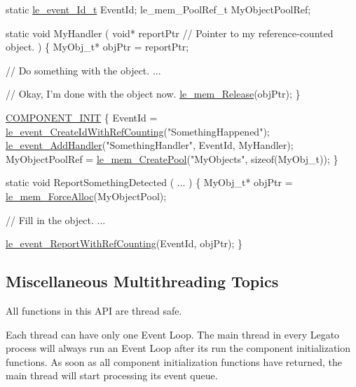 \begin{DoxyCode}
\textcolor{keyword}{static} \hyperlink{le__event_loop_8h_ae6e351b38bc95954f159d16d19d2d55c}{le\_event\_Id\_t} EventId;
le\_mem\_PoolRef\_t MyObjectPoolRef;

\textcolor{keyword}{static} \textcolor{keywordtype}{void} MyHandler
(
    \textcolor{keywordtype}{void}* reportPtr  \textcolor{comment}{// Pointer to my reference-counted object.}
)
\{
    MyObj\_t* objPtr = reportPtr;

    \textcolor{comment}{// Do something with the object.}
    ...

    \textcolor{comment}{// Okay, I'm done with the object now.}
    \hyperlink{le__mem_8h_a6d8e3fe430bcb81efe97b57ce30ef2de}{le\_mem\_Release}(objPtr);
\}

\hyperlink{le__event_loop_8h_abdb9187a56836a93d19cc793cbd4b7ec}{COMPONENT\_INIT}
\{
    EventId = \hyperlink{le__event_loop_8h_a31bef8276ad0e911fd84fb710d58ca2b}{le\_event\_CreateIdWithRefCounting}(\textcolor{stringliteral}{"SomethingHappened"});
    \hyperlink{le__event_loop_8h_ae65a65b4111618f47d7e6d57a48289e5}{le\_event\_AddHandler}(\textcolor{stringliteral}{"SomethingHandler"}, EventId, MyHandler);
    MyObjectPoolRef = \hyperlink{le__mem_8h_ab91efaa2978c9c1c7b2427d25b33241c}{le\_mem\_CreatePool}(\textcolor{stringliteral}{"MyObjects"}, \textcolor{keyword}{sizeof}(MyObj\_t));
\}

\textcolor{keyword}{static} \textcolor{keywordtype}{void} ReportSomethingDetected
(
    ...
)
\{
    MyObj\_t* objPtr = \hyperlink{le__mem_8h_af7c289c73d4182835a26a9099f3db359}{le\_mem\_ForceAlloc}(MyObjectPool);

    \textcolor{comment}{// Fill in the object.}
    ...

    \hyperlink{le__event_loop_8h_af0277165493b512216fabb6086ec7d9c}{le\_event\_ReportWithRefCounting}(EventId, objPtr);
\}
\end{DoxyCode}
\hypertarget{c_event_loop_c_event_miscThreadingTopics}{}\subsection{Miscellaneous Multithreading Topics}\label{c_event_loop_c_event_miscThreadingTopics}
All functions in this A\+P\+I are thread safe.

Each thread can have only one Event Loop. The main thread in every Legato process will always run an Event Loop after it\textquotesingle{}s run the component initialization functions. As soon as all component initialization functions have returned, the main thread will start processing its event queue.

